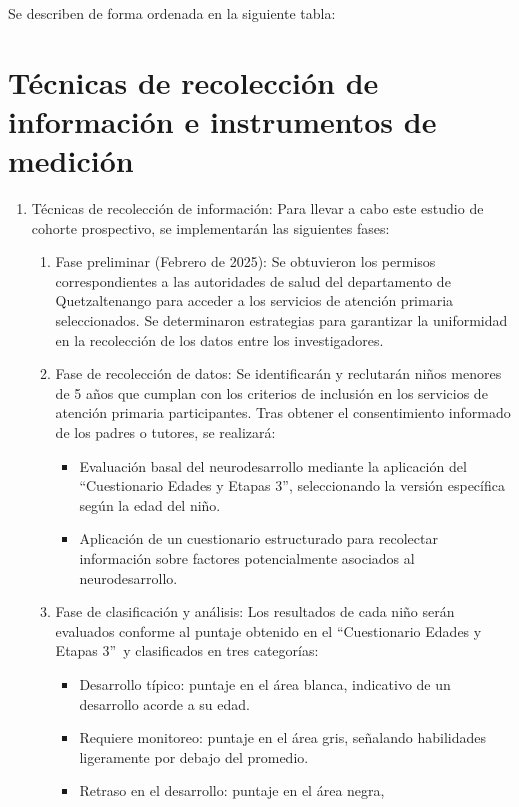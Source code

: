 \documentclass[11pt,letterpaper]{report}
\newcommand{\asq}{“Cuestionario Edades y Etapas 3”}
\begin{document}
Se describen de forma ordenada en la siguiente tabla:



\section{Técnicas de recolección de información e instrumentos de medición}
	\begin{enumerate}
		\item Técnicas de recolección de información: Para llevar a cabo este
		estudio de cohorte prospectivo, se implementarán las siguientes fases:
	\begin{enumerate}
		\item Fase preliminar (Febrero de 2025):
		Se obtuvieron los permisos correspondientes a las autoridades de salud
		del departamento de Quetzaltenango para acceder a los servicios de
		atención primaria seleccionados. Se determinaron estrategias para
		garantizar la uniformidad en la recolección de los datos entre los
		investigadores.
		\item Fase de recolección de datos:
		Se identificarán y reclutarán niños menores de 5 años que cumplan con
		los criterios de inclusión en los servicios de atención primaria
		participantes. Tras obtener el consentimiento informado de los padres o
		tutores, se realizará:
			\begin{itemize}
			\item Evaluación basal del neurodesarrollo mediante la aplicación
			del \asq, seleccionando la versión específica según la edad del
			niño.
			\item Aplicación de un cuestionario estructurado para recolectar
			información sobre factores potencialmente asociados al
			neurodesarrollo.
			\end{itemize}
		\item Fase de clasificación y análisis:
		Los resultados de cada niño serán evaluados conforme al
		puntaje obtenido en el \asq\
		y clasificados en tres categorías:
			\begin{itemize}
			\item Desarrollo típico: puntaje en el área blanca, indicativo de
			un desarrollo acorde a su edad.
			\item Requiere monitoreo: puntaje en el área gris, señalando
			habilidades ligeramente por debajo del promedio.
			\item Retraso en el desarrollo: puntaje en el área negra,

\end{itemize}
\end{enumerate}
\end{enumerate}
\end{document}
